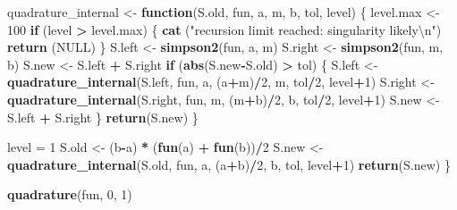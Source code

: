 \documentclass[
]{book}
\newenvironment{Shaded}{\begin{snugshade}}{\end{snugshade}}
\newcommand{\CharTok}[1]{\textcolor[rgb]{0.31,0.60,0.02}{#1}}
\newcommand{\ControlFlowTok}[1]{\textcolor[rgb]{0.13,0.29,0.53}{\textbf{#1}}}
\newcommand{\DecValTok}[1]{\textcolor[rgb]{0.00,0.00,0.81}{#1}}
\newcommand{\KeywordTok}[1]{\textcolor[rgb]{0.13,0.29,0.53}{\textbf{#1}}}
\newcommand{\NormalTok}[1]{#1}
\newcommand{\OperatorTok}[1]{\textcolor[rgb]{0.81,0.36,0.00}{\textbf{#1}}}
\newcommand{\OtherTok}[1]{\textcolor[rgb]{0.56,0.35,0.01}{#1}}
\newcommand{\StringTok}[1]{\textcolor[rgb]{0.31,0.60,0.02}{#1}}
\theoremstyle{break}
\theoremstyle{definition}
\theoremstyle{definition}
\theoremstyle{definition}
\theoremstyle{remark}
\begin{document}
\begin{Shaded}
\begin{Highlighting}[]
\NormalTok{    quadrature_internal <-}\StringTok{ }\ControlFlowTok{function}\NormalTok{(S.old, fun, a, m, b, tol, level) \{}
\NormalTok{        level.max <-}\StringTok{ }\DecValTok{100}
        \ControlFlowTok{if}\NormalTok{ (level }\OperatorTok{>}\StringTok{ }\NormalTok{level.max) \{}
            \KeywordTok{cat}\NormalTok{ (}\StringTok{"recursion limit reached: singularity likely}\CharTok{\textbackslash{}n}\StringTok{"}\NormalTok{)}
            \KeywordTok{return}\NormalTok{ (}\OtherTok{NULL}\NormalTok{)}
\NormalTok{        \}}
\NormalTok{        S.left <-}\StringTok{ }\KeywordTok{simpson2}\NormalTok{(fun, a, m) }
\NormalTok{        S.right <-}\StringTok{ }\KeywordTok{simpson2}\NormalTok{(fun, m, b)}
\NormalTok{        S.new <-}\StringTok{ }\NormalTok{S.left }\OperatorTok{+}\StringTok{ }\NormalTok{S.right}
        \ControlFlowTok{if}\NormalTok{ (}\KeywordTok{abs}\NormalTok{(S.new}\OperatorTok{-}\NormalTok{S.old) }\OperatorTok{>}\StringTok{ }\NormalTok{tol) \{}
\NormalTok{            S.left <-}\StringTok{ }\KeywordTok{quadrature_internal}\NormalTok{(S.left, fun, }
\NormalTok{                                          a, (a}\OperatorTok{+}\NormalTok{m)}\OperatorTok{/}\DecValTok{2}\NormalTok{, m, tol}\OperatorTok{/}\DecValTok{2}\NormalTok{, level}\OperatorTok{+}\DecValTok{1}\NormalTok{)}
\NormalTok{            S.right <-}\StringTok{ }\KeywordTok{quadrature_internal}\NormalTok{(S.right, fun, }
\NormalTok{                                           m, (m}\OperatorTok{+}\NormalTok{b)}\OperatorTok{/}\DecValTok{2}\NormalTok{, b, tol}\OperatorTok{/}\DecValTok{2}\NormalTok{, level}\OperatorTok{+}\DecValTok{1}\NormalTok{)}
\NormalTok{            S.new <-}\StringTok{ }\NormalTok{S.left }\OperatorTok{+}\StringTok{ }\NormalTok{S.right}
\NormalTok{        \}}
        \KeywordTok{return}\NormalTok{(S.new)}
\NormalTok{    \}}
 
\NormalTok{    level =}\StringTok{ }\DecValTok{1}
\NormalTok{    S.old <-}\StringTok{ }\NormalTok{(b}\OperatorTok{-}\NormalTok{a) }\OperatorTok{*}\StringTok{ }\NormalTok{(}\KeywordTok{fun}\NormalTok{(a) }\OperatorTok{+}\StringTok{ }\KeywordTok{fun}\NormalTok{(b))}\OperatorTok{/}\DecValTok{2}
\NormalTok{    S.new <-}\StringTok{ }\KeywordTok{quadrature_internal}\NormalTok{(S.old, fun, }
\NormalTok{                                 a, (a}\OperatorTok{+}\NormalTok{b)}\OperatorTok{/}\DecValTok{2}\NormalTok{, b, tol, level}\OperatorTok{+}\DecValTok{1}\NormalTok{)}
    \KeywordTok{return}\NormalTok{(S.new)}
\NormalTok{\}}

\KeywordTok{quadrature}\NormalTok{(fun, }\DecValTok{0}\NormalTok{, }\DecValTok{1}\NormalTok{)}
\end{Highlighting}
\end{Shaded}
\end{document}

